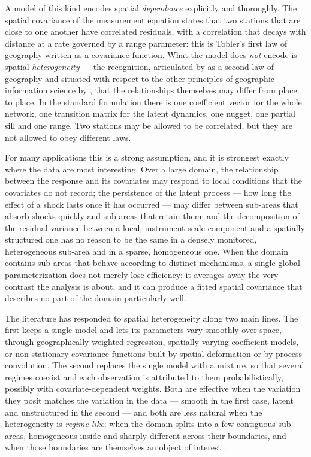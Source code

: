 A model of this kind encodes spatial \emph{dependence} explicitly and thoroughly. The spatial covariance of the measurement equation states that two stations that are close to one another have correlated residuals, with a correlation that decays with distance at a rate governed by a range parameter: this is Tobler's first law of geography \citep{Tobler1970} written as a covariance function. What the model does \emph{not} encode is spatial \emph{heterogeneity} --- the recognition, articulated by \citet{Goodchild2004} as a second law of geography and situated with respect to the other principles of geographic information science by \citet{ZhuTurner2022}, that the relationships themselves may differ from place to place. In the standard formulation there is one coefficient vector for the whole network, one transition matrix for the latent dynamics, one nugget, one partial sill and one range. Two stations may be allowed to be correlated, but they are not allowed to obey different laws.

For many applications this is a strong assumption, and it is strongest exactly where the data are most interesting. Over a large domain, the relationship between the response and its covariates may respond to local conditions that the covariates do not record; the persistence of the latent process --- how long the effect of a shock lasts once it has occurred --- may differ between sub-areas that absorb shocks quickly and sub-areas that retain them; and the decomposition of the residual variance between a local, instrument-scale component and a spatially structured one has no reason to be the same in a densely monitored, heterogeneous sub-area and in a sparse, homogeneous one. When the domain contains sub-areas that behave according to distinct mechanisms, a single global parameterization does not merely lose efficiency: it averages away the very contrast the analysis is about, and it can produce a fitted spatial covariance that describes no part of the domain particularly well.

The literature has responded to spatial heterogeneity along two main lines. The first keeps a single model and lets its parameters vary smoothly over space, through geographically weighted regression, spatially varying coefficient models, or non-stationary covariance functions built by spatial deformation or by process convolution. The second replaces the single model with a mixture, so that several regimes coexist and each observation is attributed to them probabilistically, possibly with covariate-dependent weights. Both are effective when the variation they posit matches the variation in the data --- smooth in the first case, latent and unstructured in the second --- and both are less natural when the heterogeneity is \emph{regime-like}: when the domain splits into a few contiguous sub-areas, homogeneous inside and sharply different across their boundaries, and when those boundaries are themselves an object of interest \citep[e.g.][]{anselin2024endogenous,otto2016detection}.

